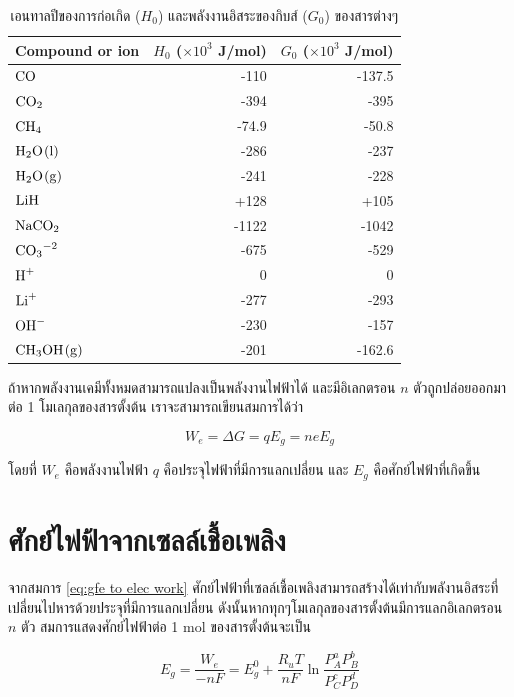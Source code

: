 \documentclass[a4paper,nobib,openany,10pt]{tufte-book}
\begin{document}
\begin{table}[htbp]
\caption{\label{tab: enthalpy and gibbs free energy}เอนทาลปีของการก่อเกิด (\(H_0\)) และพลังงานอิสระของกิบส์ (\(G_0\)) ของสารต่างๆ}
\centering
\begin{tabular}{lrr}
\toprule
Compound or ion & \(H_0\) (\(\times 10^3\) J/mol) & \(G_0\) (\(\times 10^3\) J/mol)\\
\midrule
\(\ce{CO}\) & -110 & -137.5\\
\(\ce{CO2}\) & -394 & -395\\
\(\ce{CH4}\) & -74.9 & -50.8\\
\(\ce{H2O(l)}\) & -286 & -237\\
\(\ce{H2O(g)}\) & -241 & -228\\
\(\ce{LiH}\) & +128 & +105\\
\(\ce{NaCO2}\) & -1122 & -1042\\
\(\ce{CO3^{-2}}\) & -675 & -529\\
\(\ce{H^+}\) & 0 & 0\\
\(\ce{Li^+}\) & -277 & -293\\
\(\ce{OH^-}\) & -230 & -157\\
\(\ce{CH3OH(g)}\) & -201 & -162.6\\
\bottomrule
\end{tabular}
\end{table}

ถ้าหากพลังงานเคมีทั้งหมดสามารถแปลงเป็นพลังงานไฟฟ้าได้ และมีอิเลกตรอน
\(n\) ตัวถูกปล่อยออกมาต่อ 1 โมเลกุลของสารตั้งต้น
เราจะสามารถเขียนสมการได้ว่า

\begin{equation}
\label{eq:gfe to elec work}
  W_e= \Delta G = q E_g = ne E_g
\end{equation}

โดยที่ \(W_e\) คือพลังงานไฟฟ้า \(q\) คือประจุไฟฟ้าที่มีการแลกเปลี่ยน และ
\(E_g\) คือศักย์ไฟฟ้าที่เกิดขึ้น

\section{ศักย์ไฟฟ้าจากเซลล์เชื้อเพลิง}
\label{sec:org8a7855d}
จากสมการ \ref{eq:gfe to elec work} ศักย์ไฟฟ้าที่เซลล์เชื้อเพลิงสามารถสร้างได้เท่ากับพลังานอิสระที่เปลี่ยนไปหารด้วยประจุที่มีการแลกเปลี่ยน ดังนั้นหากทุกๆโมเลกุลของสารตั้งต้นมีการแลกอิเลกตรอน \(n\) ตัว สมการแสดงศักย์ไฟฟ้าต่อ 1 mol ของสารตั้งต้นจะเป็น

\begin{equation}
\label{eq:orgfbbb6f4}
  E_g = \frac{W_e}{-nF} = E_g^0 + \frac{R_u T}{nF} \ln \frac{P_A^a P_B^b}{P_C^c P_D^d}
\end{equation}
\end{document}
